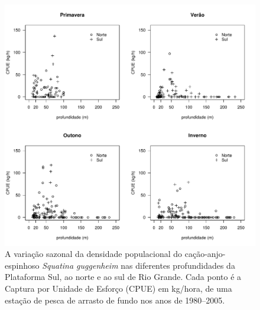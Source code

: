 \documentclass[a4paper,11pt,twoside,showtrims,onecolumn,openright,final]{memoir}
\begin{document}
%
%

\begin{figure}
\begin{center}
\includegraphics[width=\textwidth]{GUGGENHEIM_CPUEXPROFTRIMESTRES}
\end{center}
\caption[Variação sazonal da densidade populacional do cação-anjo-espinhoso \emph{Squatina guggenheim}]
	{A variação sazonal da densidade populacional do cação-anjo-espinhoso \emph{Squatina guggenheim} 
	 nas diferentes profundidades da Plataforma Sul, ao norte e ao sul de Rio Grande. 
	 Cada ponto é a Captura por Unidade de Esforço (CPUE) em kg/hora, de uma 
	 estação de pesca de arrasto de fundo nos anos de  1980--2005.}
\label{fig:guggenheim-cpueportrimestre}
\end{figure}


%
%
\end{document}
